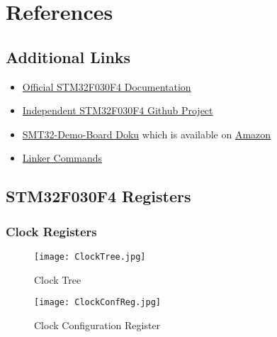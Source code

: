 \section{References}
\label{sec:References}

\subsection{Additional Links}

\begin{itemize}
	\item \href{https://www.st.com/en/microcontrollers-microprocessors/stm32f030f4.html#documentation}{Official STM32F030F4 Documentation}
	\item \href{https://github.com/dwelch67/stm32_samples/blob/master/STM32F030F4P6}{Independent STM32F030F4 Github Project}
	\item \href{https://stm32-base.org/boards/STM32F030F4P6-STM32F030-DEMO-BOARD-V1.1}{SMT32-Demo-Board Doku} which is available on \href{https://www.amazon.de/gp/product/B07JLD4M8K/ref=ppx_yo_dt_b_asin_title_o02_s00?ie=UTF8&psc=1}{Amazon}
	\item \href{http://osr507doc.sco.com/en/tools/ld_cmd_lang_sections.html#ld_cmd_lang_sections_grouping}{Linker Commands}
\end{itemize}

\pagebreak

\subsection{STM32F030F4 Registers}

\subsubsection{Clock Registers}
\label{subsec:ClockReg}

\begin{figure}[hbt!]
	\texttt{[image: ClockTree.jpg]}
	\caption{Clock Tree}
	\label{fig:ClockTree}
\end{figure}

\pagebreak

\begin{figure}[hbt!]
	\texttt{[image: ClockConfReg.jpg]}
	\caption{Clock Configuration Register}
	\label{fig:ClockConfReg}
\end{figure}

